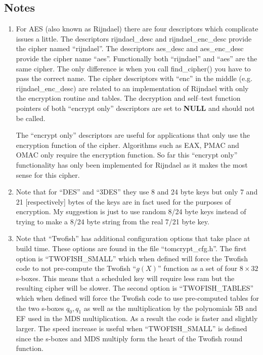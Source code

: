 \documentclass[a4paper]{book}
\begin{document}
\subsection{Notes}
\begin{small}
\begin{enumerate}
\item
For AES (also known as Rijndael) there are four descriptors which complicate issues a little.  The descriptors 
rijndael\_desc and rijndael\_enc\_desc provide the cipher named ``rijndael''.  The descriptors aes\_desc and 
aes\_enc\_desc provide the cipher name ``aes''.  Functionally both ``rijndael'' and ``aes'' are the same cipher.  The
only difference is when you call find\_cipher() you have to pass the correct name.  The cipher descriptors with ``enc'' 
in the middle (e.g. rijndael\_enc\_desc) are related to an implementation of Rijndael with only the encryption routine
and tables.  The decryption and self--test function pointers of both ``encrypt only'' descriptors are set to \textbf{NULL} and 
should not be called.

The ``encrypt only'' descriptors are useful for applications that only use the encryption function of the cipher.  Algorithms such
as EAX, PMAC and OMAC only require the encryption function.  So far this ``encrypt only'' functionality has only been implemented for
Rijndael as it makes the most sense for this cipher.

\item
Note that for ``DES'' and ``3DES'' they use 8 and 24 byte keys but only 7 and 21 [respectively] bytes of the keys are in
fact used for the purposes of encryption.  My suggestion is just to use random 8/24 byte keys instead of trying to make a 8/24
byte string from the real 7/21 byte key.

\item
Note that ``Twofish'' has additional configuration options that take place at build time.  These options are found in
the file ``tomcrypt\_cfg.h''.  The first option is ``TWOFISH\_SMALL'' which when defined will force the Twofish code
to not pre-compute the Twofish ``$g(X)$'' function as a set of four $8 \times 32$ s-boxes.  This means that a scheduled
key will require less ram but the resulting cipher will be slower.  The second option is ``TWOFISH\_TABLES'' which when
defined will force the Twofish code to use pre-computed tables for the two s-boxes $q_0, q_1$ as well as the multiplication
by the polynomials 5B and EF used in the MDS multiplication.  As a result the code is faster and slightly larger.  The
speed increase is useful when ``TWOFISH\_SMALL'' is defined since the s-boxes and MDS multiply form the heart of the
Twofish round function.


\end{enumerate}
\end{small}
\end{document}
